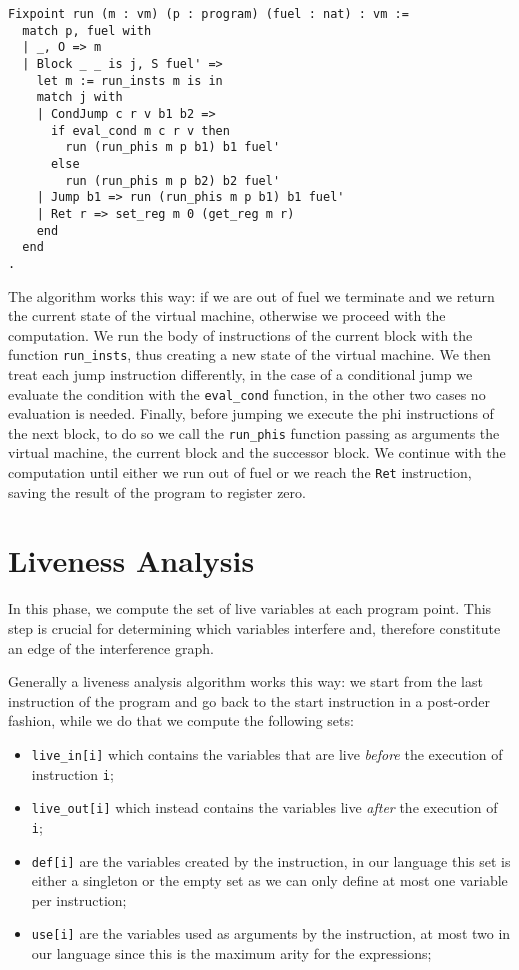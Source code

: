 \begin{lstlisting}[language=Coq]
Fixpoint run (m : vm) (p : program) (fuel : nat) : vm :=
  match p, fuel with
  | _, O => m
  | Block _ _ is j, S fuel' =>
    let m := run_insts m is in
    match j with
    | CondJump c r v b1 b2 =>
      if eval_cond m c r v then
        run (run_phis m p b1) b1 fuel'
      else
        run (run_phis m p b2) b2 fuel'
    | Jump b1 => run (run_phis m p b1) b1 fuel'
    | Ret r => set_reg m 0 (get_reg m r)
    end
  end
.
\end{lstlisting}

The algorithm works this way: if we are out of fuel we terminate and we return the current state of the virtual machine, otherwise we proceed with the computation.
We run the body of instructions of the current block with the function \texttt{run\_insts}, thus creating a new state of the virtual machine. We then treat each jump instruction differently, in the case of a conditional jump we evaluate the condition with the \texttt{eval\_cond} function, in the other two cases no evaluation is needed. Finally, before jumping we execute the phi instructions of the next block, to do so we call the \texttt{run\_phis} function  passing as arguments the virtual machine, the current block and the successor block.
We continue with the computation until either we run out of fuel or we reach the \texttt{Ret} instruction, saving the result of the program to register zero.

\section{Liveness Analysis}

In this phase, we compute the set of live variables at each program point. This step is crucial for determining which variables interfere and, therefore constitute an edge of the interference graph.

Generally a liveness analysis algorithm works this way:
we start from the last instruction of the program and go back to the start instruction in a post-order fashion, while we do that we compute the following sets:
\begin{itemize}
  \item \texttt{live\_in[i]} which contains the variables that are live \textit{before} the execution of instruction \texttt i;
  \item \texttt{live\_out[i]} which instead contains the variables live \textit{after} the execution of \texttt i;
  \item \texttt{def[i]} are the variables created by the instruction, in our language this set is either a singleton or the empty set as we can only define at most one variable per instruction;
  \item \texttt{use[i]} are the variables used as arguments by the instruction, at most two in our language since this is the maximum arity for the expressions;
\end{itemize}

